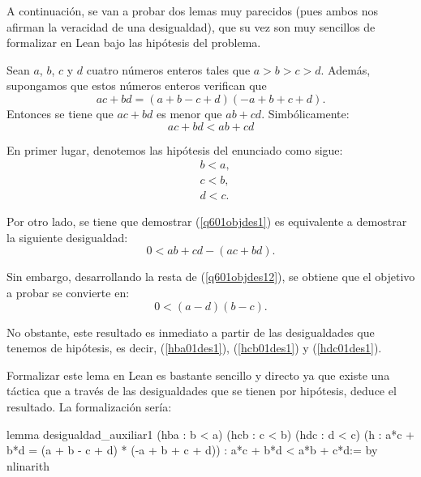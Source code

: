 A continuación, se van a probar dos lemas muy parecidos (pues ambos nos
afirman la veracidad de una desigualdad), que su vez son muy sencillos de
formalizar en Lean bajo las hipótesis del problema.

\begin{lema}\label{lemades1}
  Sean \(a\), \(b\), \(c\) y \(d\) cuatro números enteros tales que
  \(a > b > c > d \). Además, supongamos que
  estos números enteros verifican que
    \begin{equation}\tag{h}
      ac+bd = (a+b-c+d)(-a+b+c+d).
    \end{equation}
    Entonces se tiene que \(ac+bd\) es menor que \(ab+cd\). Simbólicamente:
    \begin{equation}\label{q601objdes1}
      ac+bd<ab+cd
    \end{equation}
\end{lema}

\begin{demostracion}
    En primer lugar, denotemos las hipótesis del enunciado como sigue:
  \begin{align}
    &b<a,\tag{hba}\label{hba01des1}\\
    &c<b,\tag{hcb}\label{hcb01des1}\\
    &d<c.\tag{hdc}\label{hdc01des1}
  \end{align}

  Por otro lado, se tiene que demostrar (\ref{q601objdes1}) es equivalente
  a demostrar la siguiente desigualdad:
  \begin{equation}\label{q601objdes12}
      0<ab+cd-(ac+bd).
  \end{equation}

  Sin embargo, desarrollando la resta de (\ref{q601objdes12}), se obtiene
  que el objetivo a probar se convierte en:
  \begin{equation}\label{q601objdes13}
      0<(a-d)(b-c).
  \end{equation}

  No obstante, este resultado es inmediato a partir de las desigualdades
  que tenemos de hipótesis, es decir, (\ref{hba01des1}), (\ref{hcb01des1})
  y (\ref{hdc01des1}).
\end{demostracion}

Formalizar este lema en Lean es bastante sencillo y directo ya que existe
una táctica que a través de las desigualdades que se tienen por hipótesis,
deduce el resultado. La formalización sería:
\begin{leancode}
lemma desigualdad_auxiliar1
  (hba : b < a)
  (hcb : c < b)
  (hdc : d < c)
  (h : a*c + b*d = (a + b - c + d) * (-a + b + c + d))
  : a*c + b*d < a*b + c*d:=
by nlinarith
\end{leancode}

